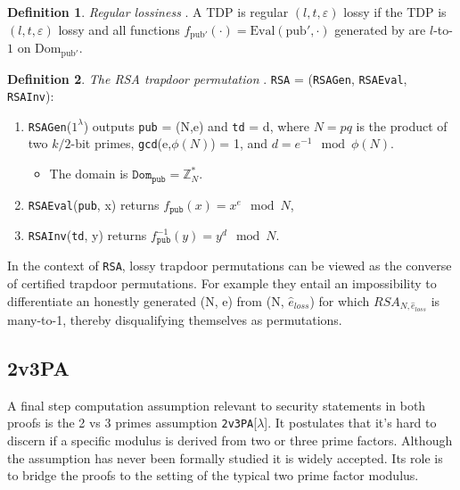 \documentclass[]{final_report}
\theoremstyle{definition}
\newtheorem{definition}{Definition}[chapter]
\begin{document}
\begin{definition}
\label{def:reg-los}
\textit{Regular lossiness} \cite{10.1145/1374376.1374406, kakvi2018optimal}. A TDP is regular \( (l, t, \varepsilon) \) lossy if the TDP is \( (l, t, \varepsilon) \) lossy and all functions \( f_{\text{pub}'}(\cdot) = \text{Eval}(\text{pub}', \cdot) \) generated by  are \( l \)-to-\( 1 \) on \( \text{Dom}_{\text{pub}'} \).
\end{definition}

\begin{definition} 
\textit{The RSA trapdoor permutation} \cite{kakvi2018optimal}. \texttt{RSA} = (\texttt{RSAGen}, \texttt{RSAEval}, \texttt{RSAInv}): 
\begin{enumerate}
\item \texttt{RSAGen}($1^\lambda$) outputs \texttt{pub} = (N,e) and \texttt{td} = d, where $N = pq$ is the product of two $k/2$-bit primes, \texttt{gcd}(e,$\phi(N)$) = 1, and $d = e^{-1} \mod \phi(N)$. 
\begin{itemize}
\item The domain is $\texttt{Dom}_{\texttt{pub}} = \mathbb{Z}_N^*$. 
\end{itemize}
\item \texttt{RSAEval}(\texttt{pub}, x) returns $f_{\texttt{pub}}(x) = x^e \mod N$, 
\item \texttt{RSAInv}(\texttt{td}, y) returns $f_{\texttt{pub}}^{-1}(y) = y^d \mod N$. 
\end{enumerate}

\end{definition} 

In the context of \texttt{RSA}, lossy trapdoor permutations can be viewed as the converse of certified trapdoor permutations. For example they entail an impossibility to differentiate an honestly generated (N, e) from (N, $\hat{e}_{loss}$) for which $RSA_{N, \hat{e}_{loss}}$ is many-to-1, thereby disqualifying themselves as permutations.


\subsection{2v3PA}
A final step computation assumption relevant to security statements in both proofs is the 2 vs 3 primes assumption \texttt{2v3PA}[$\lambda$]. It postulates that it's hard to discern if a specific modulus is derived from two or three prime factors. Although the assumption has never been formally studied it is widely accepted. Its role is to bridge the proofs to the setting of the typical two prime factor modulus.
\end{document}

